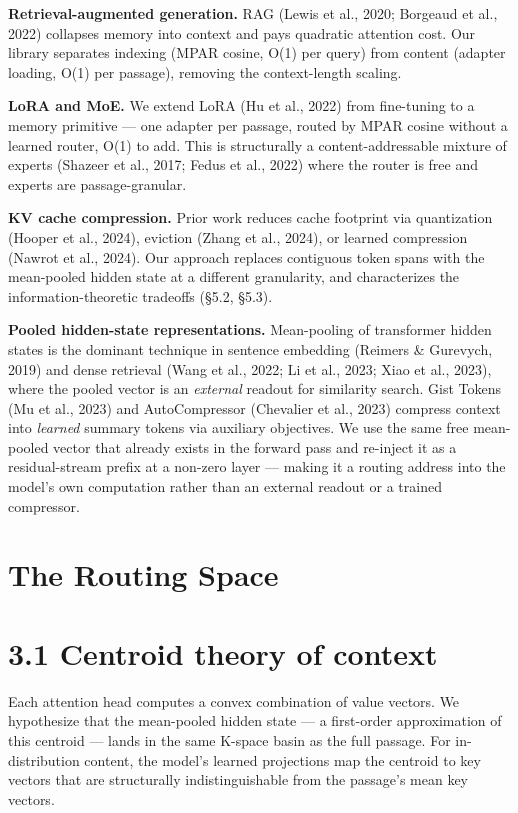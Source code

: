 \textbf{Retrieval-augmented generation.} RAG (Lewis et al., 2020; Borgeaud et al., 2022) collapses memory into context and pays quadratic attention cost. Our library separates indexing (MPAR cosine, O(1) per query) from content (adapter loading, O(1) per passage), removing the context-length scaling.

\textbf{LoRA and MoE.} We extend LoRA (Hu et al., 2022) from fine-tuning to a memory primitive --- one adapter per passage, routed by MPAR cosine without a learned router, O(1) to add. This is structurally a content-addressable mixture of experts (Shazeer et al., 2017; Fedus et al., 2022) where the router is free and experts are passage-granular.

\textbf{KV cache compression.} Prior work reduces cache footprint via quantization (Hooper et al., 2024), eviction (Zhang et al., 2024), or learned compression (Nawrot et al., 2024). Our approach replaces contiguous token spans with the mean-pooled hidden state at a different granularity, and characterizes the information-theoretic tradeoffs (\S 5.2, \S 5.3).

\textbf{Pooled hidden-state representations.} Mean-pooling of transformer hidden states is the dominant technique in sentence embedding (Reimers \& Gurevych, 2019) and dense retrieval (Wang et al., 2022; Li et al., 2023; Xiao et al., 2023), where the pooled vector is an \emph{external} readout for similarity search. Gist Tokens (Mu et al., 2023) and AutoCompressor (Chevalier et al., 2023) compress context into \emph{learned} summary tokens via auxiliary objectives. We use the same free mean-pooled vector that already exists in the forward pass and re-inject it as a residual-stream prefix at a non-zero layer --- making it a routing address into the model's own computation rather than an external readout or a trained compressor.

\section{The Routing Space}\label{the-routing-space}

\section{3.1 Centroid theory of context}\label{centroid-theory-of-context}

Each attention head computes a convex combination of value vectors. We hypothesize that the mean-pooled hidden state --- a first-order approximation of this centroid --- lands in the same K-space basin as the full passage. For in-distribution content, the model's learned projections map the centroid to key vectors that are structurally indistinguishable from the passage's mean key vectors.

